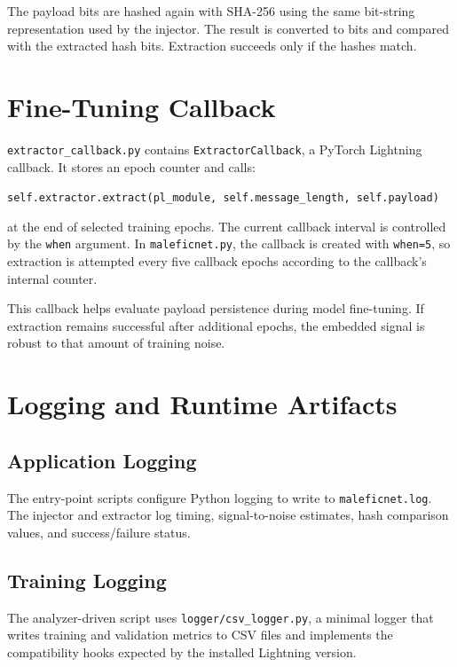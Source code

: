 \documentclass[11pt,a4paper]{article}
\newcommand{\code}[1]{\texttt{#1}}
\begin{document}
The payload bits are hashed again with SHA-256 using the same bit-string representation used by the injector. The result is converted to bits and compared with the extracted hash bits. Extraction succeeds only if the hashes match.

\section{Fine-Tuning Callback}

\code{extractor\_callback.py} contains \code{ExtractorCallback}, a PyTorch Lightning callback. It stores an epoch counter and calls:

\begin{center}
\code{self.extractor.extract(pl\_module, self.message\_length, self.payload)}
\end{center}

at the end of selected training epochs. The current callback interval is controlled by the \code{when} argument. In \code{maleficnet.py}, the callback is created with \code{when=5}, so extraction is attempted every five callback epochs according to the callback's internal counter.

This callback helps evaluate payload persistence during model fine-tuning. If extraction remains successful after additional epochs, the embedded signal is robust to that amount of training noise.

\section{Logging and Runtime Artifacts}

\subsection{Application Logging}

The entry-point scripts configure Python logging to write to \code{maleficnet.log}. The injector and extractor log timing, signal-to-noise estimates, hash comparison values, and success/failure status.

\subsection{Training Logging}

The analyzer-driven script uses \code{logger/csv\_logger.py}, a minimal logger that writes training and validation metrics to CSV files and implements the compatibility hooks expected by the installed Lightning version.
\end{document}
